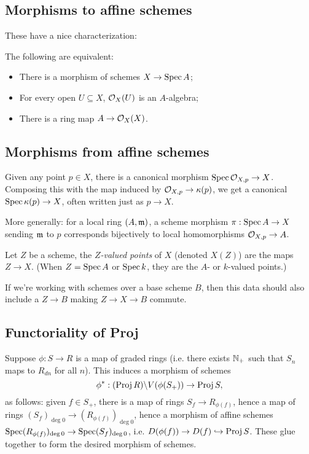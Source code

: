 \documentclass[11pt]{amsart}
\begin{document}
\subsection{Morphisms to affine schemes}

These have a nice characterization:

\begin{prop}
The following are equivalent:
\begin{itemize}
    \item There is a morphism of schemes $X\to \operatorname{Spec} A$;
    \item For every open $U\subseteq X$, $\mathcal{O}_X(U)$ is an $A$-algebra;
    \item There is a ring map $A\to \mathcal{O}_X(X)$.
\end{itemize}
\end{prop}

\subsection{Morphisms from affine schemes}


Given any point $p\in X$, there is a canonical morphism $\operatorname{Spec} \mathcal{O}_{X,p} \to X$. Composing this with the map induced by $\mathcal{O}_{X,p} \to \kappa(p)$, we get a canonical $\operatorname{Spec} \kappa(p) \to X$, often written just as $p\to X$.

More generally: for a local ring $(A,\mathfrak{m})$, a scheme morphism $\pi:\operatorname{Spec} A \to X$ sending $\mathfrak{m}$ to $p$ corresponds bijectively to local homomorphisms $\mathcal{O}_{X,p} \to A$.

\begin{defn}
Let $Z$ be a scheme, the \emph{$Z$-valued points} of $X$ (denoted $X(Z)$) are the maps $Z\to X$. (When $Z=\operatorname{Spec} A$ or $\operatorname{Spec} k$, they are the $A$- or $k$-valued points.)
\end{defn}

If we're working with schemes over a base scheme $B$, then this data should also include a $Z\to B$ making $Z\to X\to B$ commute.

\subsection{Functoriality of Proj}

Suppose $\phi: S \to R$ is a map of graded rings (i.e. there exists $\mathbb{N}_+$ such that $S_n$ maps to $R_{dn}$ for all $n$). This induces a morphism of schemes
\[\phi^*: (\operatorname{Proj} R)\backslash V(\phi(S_+)) \to \operatorname{Proj} S,\]
as follows: given $f\in S_+$, there is a map of rings $S_f\to R_{\phi(f)}$, hence a map of rings $(S_f)_{\deg 0} \to (R_{\phi(f)})_{\deg 0}$, hence a morphism of affine schemes $\operatorname{Spec} (R_{\phi(f)})_{\deg 0} \to \operatorname{Spec} (S_f)_{\deg 0}$, i.e. $D(\phi(f)) \to D(f) \hookrightarrow \operatorname{Proj} S$. These glue together to form the desired morphism of schemes.
\end{document}
